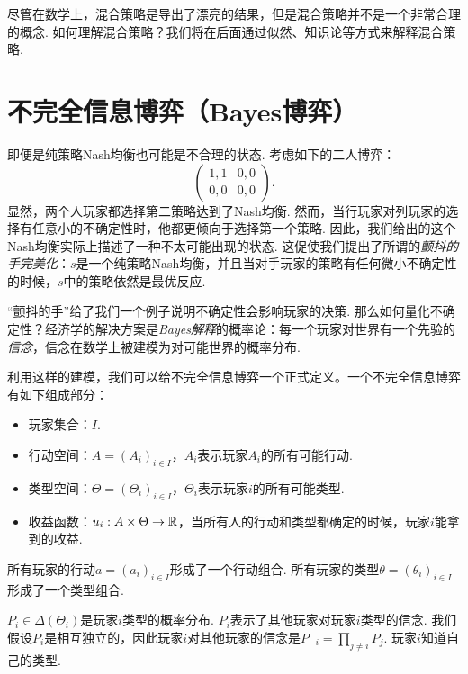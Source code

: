 尽管在数学上，混合策略是导出了漂亮的结果，但是混合策略并不是一个非常合理的概念. 如何理解混合策略？我们将在后面通过似然、知识论等方式来解释混合策略.


\section{不完全信息博弈（Bayes博弈）}

即便是纯策略Nash均衡也可能是不合理的状态. 考虑如下的二人博弈：
    \[\begin{pmatrix}
    1,1&0,0\\
    0,0&0,0
    \end{pmatrix}.\]
显然，两个人玩家都选择第二策略达到了Nash均衡. 然而，当行玩家对列玩家的选择有任意小的不确定性时，他都更倾向于选择第一个策略. 因此，我们给出的这个Nash均衡实际上描述了一种不太可能出现的状态. 这促使我们提出了所谓的\emph{颤抖的手完美化}：$s$是一个纯策略Nash均衡，并且当对手玩家的策略有任何微小不确定性的时候，$s$中的策略依然是最优反应.

“颤抖的手”给了我们一个例子说明不确定性会影响玩家的决策. 那么如何量化不确定性？经济学的解决方案是\emph{Bayes解释}的概率论：每一个玩家对世界有一个先验的\emph{信念}，信念在数学上被建模为对可能世界的概率分布.

利用这样的建模，我们可以给不完全信息博弈一个正式定义。一个不完全信息博弈有如下组成部分：
\begin{itemize}
\item 玩家集合：$I$.
\item 行动空间：$A=(A_i)_{i\in I}$，$A_i$表示玩家$A_i$的所有可能行动.
\item 类型空间：$\Theta=(\Theta_i)_{i\in I}$，$\Theta_i$表示玩家$i$的所有可能类型.
\item 收益函数：$u_i:A\times\Theta\to\mathbb{R}$，当所有人的行动和类型都确定的时候，玩家$i$能拿到的收益.
\end{itemize}
所有玩家的行动$a=(a_i)_{i\in I}$形成了一个行动组合. 所有玩家的类型$\theta=(\theta_i)_{i\in I}$形成了一个类型组合.

 $P_i\in\Delta(\Theta_i)$是玩家$i$类型的概率分布. $P_i$表示了其他玩家对玩家$i$类型的信念. 我们假设$P_i$是相互独立的，因此玩家$i$对其他玩家的信念是$P_{-i}=\prod_{j\neq i}P_j$. 玩家$i$知道自己的类型.

